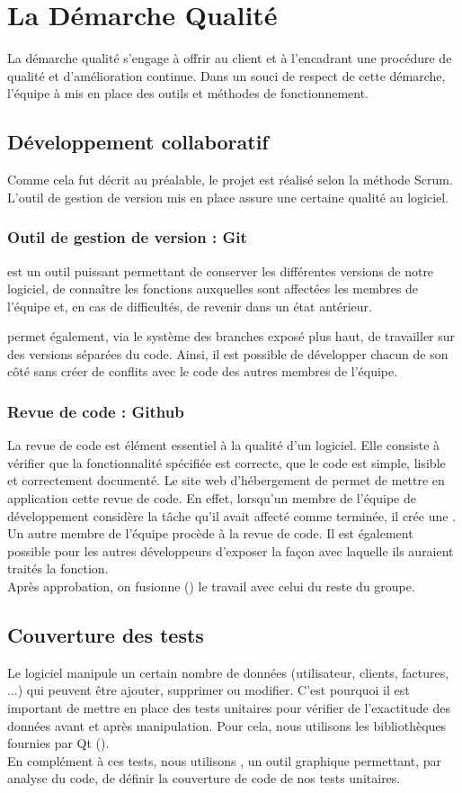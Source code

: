 \chapter{La Démarche Qualité}
La démarche qualité s'engage à offrir au client et à l'encadrant une procédure de qualité et d'amélioration continue. 
Dans un souci de respect de cette démarche, l'équipe à mis en place des outils et méthodes de fonctionnement. 
\section{Développement collaboratif}
Comme cela fut décrit au préalable, le projet est réalisé selon la méthode Scrum. L'outil de gestion de version  mis en place assure une certaine qualité au logiciel.
\subsection{Outil de gestion de version : Git}
 est un outil puissant permettant de conserver les différentes versions de notre logiciel, de connaître les fonctions auxquelles sont affectées les membres de l'équipe et, en cas de difficultés, de revenir dans un état antérieur. 

 permet également, via le système des branches exposé plus haut, de travailler sur des versions séparées du code. Ainsi, il est possible de développer chacun de son côté sans créer de conflits avec le code des autres membres de l'équipe. 
\subsection{Revue de code : Github}
La revue de code est élément essentiel à la qualité d'un logiciel. Elle consiste à vérifier que la fonctionnalité spécifiée est correcte, que le code est simple, lisible et correctement documenté. Le site web d'hébergement  de  permet de mettre en application cette revue de code. En effet, lorsqu'un membre de l'équipe de développement considère la tâche qu'il avait affecté comme terminée, il crée une . Un autre membre de l'équipe procède à la revue de code. Il est également possible pour les autres développeurs d'exposer la façon avec laquelle ils auraient traités la fonction. \\
Après approbation, on fusionne () le travail avec celui du reste du groupe. 
\section{Couverture des tests}
Le logiciel \FactDev manipule un certain nombre de données (utilisateur, clients, factures, ...) qui peuvent être ajouter, supprimer ou modifier. C'est pourquoi il est important de mettre en place des tests unitaires pour vérifier de l'exactitude des données avant et après manipulation. Pour cela, nous utilisons les bibliothèques fournies par Qt (). \\
En complément à ces tests, nous utilisons , un outil graphique permettant, par analyse du code, de définir la couverture de code de nos tests unitaires. 
